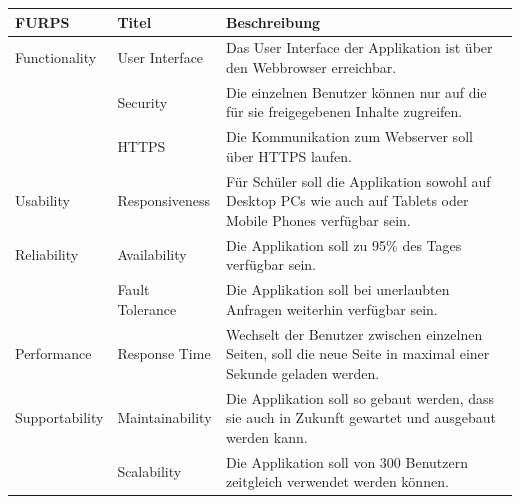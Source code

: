 \begin{table}[h]
	\centering
	\begin{tabu} to 0.9\textwidth {l l X}
	\toprule
	FURPS & Titel & Beschreibung \\ 
	\midrule
	Functionality & User Interface & Das User Interface der Applikation ist über den Webbrowser erreichbar. \\ 
	& Security & Die einzelnen Benutzer können nur auf die für sie freigegebenen Inhalte zugreifen. \\
	& HTTPS & Die Kommunikation zum Webserver soll über HTTPS laufen. \\
	\midrule
	Usability & Responsiveness & Für Schüler soll die Applikation sowohl auf Desktop PCs wie auch auf Tablets oder Mobile Phones verfügbar sein. \\
	\midrule
	Reliability & Availability & Die Applikation soll zu 95\% des Tages verfügbar sein. \\
	 & Fault Tolerance & Die Applikation soll bei unerlaubten Anfragen weiterhin verfügbar sein. \\
	\midrule
	Performance & Response Time & Wechselt der Benutzer zwischen einzelnen Seiten, soll die neue Seite in maximal einer Sekunde geladen werden.\\
	\midrule
	Supportability & Maintainability & Die Applikation soll so gebaut werden, dass sie auch in Zukunft gewartet und ausgebaut werden kann. \\
	 & Scalability & Die Applikation soll von 300 Benutzern zeitgleich verwendet werden können. \\
	\bottomrule
	\end{tabu}
\end{table}

